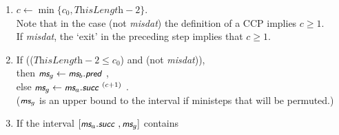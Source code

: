 \documentclass[a4paper,12pt,fleqn]{article}
\newcommand{\nnm}[1]{\textsf{\small\textit{#1}\ }}
\newcommand{\ms}{\textsl{\textsf{\small ms}}} %
\newcommand{\remark}[1]{{\textcolor[named]{Red}{#1}}}
\begin{document}
\begin{enumerate}
\begin{enumerate}
\begin{enumerate}
\begin{enumerate}
                    \item if \textit{ChainNumMisNet} = 0, then exit.
                    \item $\ms_a \leftarrow $ \textit{RandomMisNet}
                    \end{enumerate}
            \item  if $w_0 = B$, then
                    \begin{enumerate}
                    \item if \textit{ChainNumMisBeh} = 0, then exit.
                    \item $\ms_a \leftarrow $ \textit{RandomMisBeh}
                    \end{enumerate}
            \item $\textit{ThisLength} \leftarrow \textit{length}(\ms_a, \nnm{last})$
            \item If $\ms_a.\nnm{succ} = \nnm{last}$ (i.e., \textit{ThisLength} = 2), exit.\\
            \end{enumerate}
      \end{enumerate}
\vspace*{-1em}
\item  $c \leftarrow \min\{c_0, \textit{ThisLength} - 2\}$.\\
       Note that in the case (not \textit{misdat}) the definition of a CCP implies $c \geq 1$.\\
      If \textit{misdat}, the `exit' in the preceding step implies that $c \geq 1$.\\
      \item If (($\textit{ThisLength}-2 \leq c_0$) and (not \textit{misdat})), \\
            then $\ms_g \leftarrow  \ms_b.\nnm{pred}$,\\
             else $\ms_g \leftarrow \ms_a.\nnm{succ}^{(c+1)}$ .\\
             ($\ms_g$ is an upper bound to the interval if ministeps
             that will be permuted.)
      \item If the interval $[\ms_a.\nnm{succ}, \ms_g]$ contains

\end{enumerate}
\end{document}
